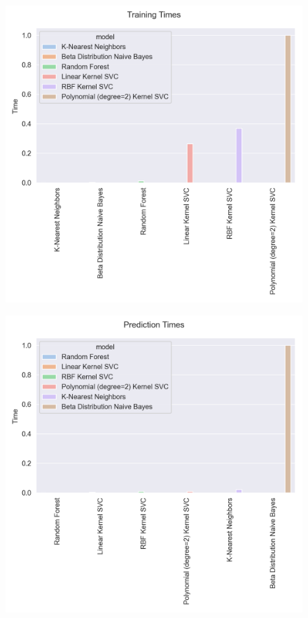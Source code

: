 \begin{figure}[h]
    \centering

    \begin{minipage}{0.475\textwidth}   
        \centering 
        \includegraphics[scale=0.55]{images/exp-results/training_times.png}
        \label{fig:exp_res_training_time_all}
    \end{minipage}
    \hspace{.025\linewidth}
    \begin{minipage}{0.475\textwidth}
        \centering
        \includegraphics[scale=0.55]{images/exp-results/prediction_times.png}

\end{minipage}
\end{figure}
